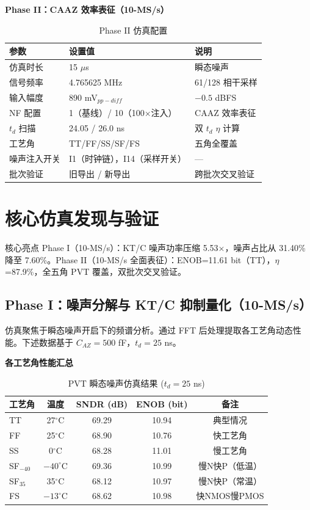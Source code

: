 \documentclass[11pt,a4paper,UTF8]{ctexart}
\begin{document}
\textbf{Phase II：CAAZ 效率表征（10-MS/s）}

\begin{table}[htbp]\centering\caption{Phase II 仿真配置}\label{tab:sim2}\small
\begin{tabular}{lll}\toprule
\textbf{参数} & \textbf{设置值} & \textbf{说明} \\\midrule
仿真时长 & 15 $\mu$s & 瞬态噪声 \\
信号频率 & 4.765625 MHz & 61/128 相干采样 \\
输入幅度 & 890 mV$_{pp-diff}$ & $-0.5$ dBFS \\
NF 配置 & 1（基线）/ 10（100$\times$注入） & CAAZ 效率表征 \\
$t_d$ 扫描 & 24.05 / 26.0 ns & 双 $t_d$ $\eta$ 计算 \\
工艺角 & TT/FF/SS/SF/FS & 五角全覆盖 \\
噪声注入开关 & I1（时钟链），I14（采样开关） & — \\
批次验证 & 旧导出 / 新导出 & 跨批次交叉验证 \\\bottomrule
\end{tabular}
\end{table}

\section{核心仿真发现与验证}
\label{sec:results}

\begin{findbox}{核心亮点}
Phase I（10-MS/s）：KT/C 噪声功率压缩 5.53$\times$，噪声占比从 31.40\% 降至 7.60\%。Phase II（10-MS/s 全面表征）：ENOB=11.61 bit（TT），$\eta$=87.9\%，全五角 PVT 覆盖，双批次交叉验证。
\end{findbox}

\subsection{Phase I：噪声分解与 KT/C 抑制量化（10-MS/s）}

仿真聚焦于瞬态噪声开启下的频谱分析。通过 FFT 后处理提取各工艺角动态性能。下述数据基于 $C_{AZ}=500$ fF，$t_d=25$ ns。

\textbf{各工艺角性能汇总}

\begin{table}[htbp]\centering\caption{PVT 瞬态噪声仿真结果 ($t_d=25$ ns)}\label{tab:pvt1}\small
\begin{tabular}{lcccc}\toprule
\textbf{工艺角} & \textbf{温度} & \textbf{SNDR (dB)} & \textbf{ENOB (bit)} & \textbf{备注} \\\midrule
TT & 27$^\circ$C & 69.29 & 10.94 & 典型情况 \\
FF & 25$^\circ$C & 68.90 & 10.76 & 快工艺角 \\
SS & 0$^\circ$C & 68.28 & 11.01 & 慢工艺角 \\
SF$_{-40}$ & $-40^\circ$C & 69.36 & 10.99 & 慢N快P（低温） \\
SF$_{35}$ & 35$^\circ$C & 68.12 & 10.97 & 慢N快P（常温） \\
FS & $-13^\circ$C & 68.62 & 10.98 & 快NMOS慢PMOS \\\bottomrule
\end{tabular}
\end{table}
\end{document}
